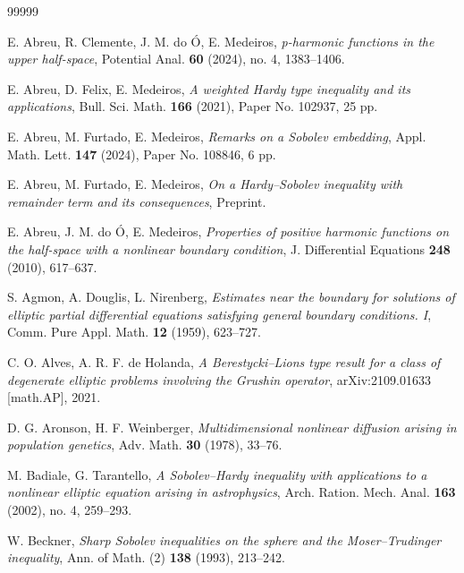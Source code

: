 \documentclass[12pt,reqno]{amsart}
\begin{document}
\begin{thebibliography}{99999}

 E. Abreu, R. Clemente, J. M. do Ó, E. Medeiros, \textit{p-harmonic functions in the upper half-space}, Potential Anal. \textbf{60} (2024), no. 4, 1383–1406.

 E. Abreu, D. Felix, E. Medeiros, \textit{A weighted Hardy type inequality and its applications}, Bull. Sci. Math. \textbf{166} (2021), Paper No. 102937, 25 pp.

 E. Abreu, M. Furtado, E. Medeiros, \textit{Remarks on a Sobolev embedding}, Appl. Math. Lett. \textbf{147} (2024), Paper No. 108846, 6 pp.

 E. Abreu, M. Furtado, E. Medeiros, \textit{On a Hardy–Sobolev inequality with remainder term and its consequences}, Preprint.

 E. Abreu, J. M. do Ó, E. Medeiros, \textit{Properties of positive harmonic functions on the half-space with a nonlinear boundary condition}, J. Differential Equations \textbf{248} (2010), 617–637.

 S. Agmon, A. Douglis, L. Nirenberg, \textit{Estimates near the boundary for solutions of elliptic partial differential equations satisfying general boundary conditions. I}, Comm. Pure Appl. Math. \textbf{12} (1959), 623–727.

 C. O. Alves, A. R. F. de Holanda, \textit{A Berestycki–Lions type result for a class of degenerate elliptic problems involving the Grushin operator}, arXiv:2109.01633 [math.AP], 2021.

 D. G. Aronson, H. F. Weinberger, \textit{Multidimensional nonlinear diffusion arising in population genetics}, Adv. Math. \textbf{30} (1978), 33–76.

 M. Badiale, G. Tarantello, \textit{A Sobolev–Hardy inequality with applications to a nonlinear elliptic equation arising in astrophysics}, Arch. Ration. Mech. Anal. \textbf{163} (2002), no. 4, 259–293.

 W. Beckner, \textit{Sharp Sobolev inequalities on the sphere and the Moser–Trudinger inequality}, Ann. of Math. (2) \textbf{138} (1993), 213–242.


\end{thebibliography}
\end{document}

